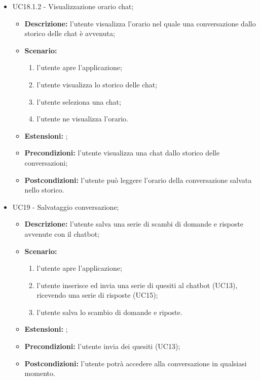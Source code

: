 \documentclass[10pt, a4paper]{article}
\begin{document}
\begin{itemize}
    \item UC18.1.2 - Visualizzazione orario chat;
    \begin{itemize}
        \item \textbf{Descrizione: }l'utente visualizza l'orario nel quale una conversazione dallo storico delle chat è avvenuta;
        \item \textbf{Scenario: }
        \begin{enumerate}[label={\arabic*.}, align=left]
        \item l'utente apre l'applicazione;
        \item l'utente visualizza lo storico delle chat;
        \item l'utente seleziona una chat;
        \item l'utente ne visualizza l'orario.
        \end{enumerate}
        \item \textbf{Estensioni: };
        \item \textbf{Precondizioni:} l'utente visualizza una chat dallo storico delle conversazioni;
        \item \textbf{Postcondizioni: }l'utente può leggere l'orario della conversazione salvata nello storico.\\
    \end{itemize}

    \item UC19 - Salvataggio conversazione;
    \begin{itemize}
        \item \textbf{Descrizione: }l'utente salva una serie di scambi di domande e risposte avvenute con il chatbot;
        \item \textbf{Scenario: }
        \begin{enumerate}[label={\arabic*.}, align=left]
        \item l'utente apre l'applicazione;
        \item l'utente inserisce ed invia una serie di quesiti al chatbot (UC13), ricevendo una serie di risposte (UC15);
        \item l'utente salva lo scambio di domande e riposte.
        \end{enumerate}
        \item \textbf{Estensioni: };
        \item \textbf{Precondizioni:} l'utente invia dei quesiti (UC13);
        \item \textbf{Postcondizioni: }l'utente potrà accedere alla conversazione in qualsiasi momento.\\
    \end{itemize}


\end{itemize}
\end{document}
